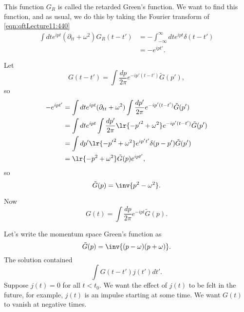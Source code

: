 This function \( G_R \) is called the retarded Green's function.  We want to find this function, and as usual, we do this by taking the Fourier transform of \cref{eqn:qftLecture11:440}
\begin{equation}\label{eqn:qftLecture11:480}
\begin{aligned}
\int dt e^{i p t}
(\partial_{tt} + \omega^2) G_R(t - t')
&=
-\int_{-\infty}^\infty dt e^{i p t}
\delta(t - t') \\
&= - e^{i p t'}.
\end{aligned}
\end{equation}

Let
\begin{equation}\label{eqn:qftLecture11:500}
G(t - t')  = \int \frac{dp }{2 \pi} e^{- i p'(t - t')} \tilde{G}(p'),
\end{equation}
so
\begin{equation}\label{eqn:qftLecture11:520}
\begin{aligned}
- e^{i pt'}
&=
\int dt e^{i p t}
(\partial_{tt} + \omega^2)
\int \frac{dp'}{2 \pi} e^{- i p'(t - t')} \tilde{G}(p') \\
&=
\int dt e^{i p t} \int
\frac{dp'}{2 \pi} \lr{ -{p'}^2 + \omega^2 } e^{- i p'(t - t')} \tilde{G}(p') \\
&=
\int dp' \lr{ -{p'}^2 + \omega^2 } e^{i p' t'} \delta(p - p') \tilde{G}(p') \\
&=
\lr{ -{p}^2 + \omega^2 } \tilde{G}(p) e^{i p t'},
\end{aligned}
\end{equation}
so
\begin{equation}\label{eqn:qftLecture11:540}
\tilde{G}(p) = \inv{p^2 - \omega^2}.
\end{equation}

Now
\begin{equation}\label{eqn:qftLecture11:560}
G(t) = \int \frac{dp}{2 \pi} e^{-i p t}
\tilde{G}(p).
\end{equation}

Let's write the momentum space Green's function as
\begin{equation}\label{eqn:qftLecture11:580}
\tilde{G}(p) = \inv{(p - \omega)(p + \omega)}.
\end{equation}
The solution contained
\begin{equation}\label{eqn:qftLecture11:600}
\int G(t - t') j(t') dt'.
\end{equation}
Suppose \( j(t) = 0 \) for all \( t < t_0 \).  We want the effect of \( j(t) \) to be felt in the future, for example, \(j(t) \) is an impulse starting at some time.  We want \( G(t) \) to vanish at negative times.

